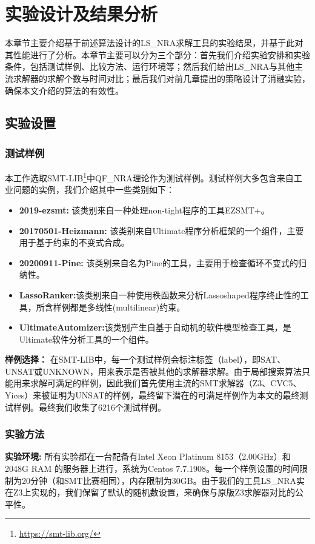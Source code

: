 \chapter{实验设计及结果分析}\label{chap:Result}

本章节主要介绍基于前述算法设计的LS\_NRA求解工具的实验结果，并基于此对其性能进行了分析。本章节主要可以分为三个部分：首先我们介绍实验安排和实验条件，包括测试样例、比较方法、运行环境等；然后我们给出LS\_NRA与其他主流求解器的求解个数与时间对比；最后我们对前几章提出的策略设计了消融实验，确保本文介绍的算法的有效性。

\section{实验设置}
\subsection{测试样例}
本工作选取SMT-LIB\footnote{\url{https://smt-lib.org/}}中QF\_NRA理论作为测试样例。测试样例大多包含来自工业问题的实例，我们介绍其中一些类别如下：

\begin{itemize}
    \item \textbf{2019-ezsmt\cite{SusmanL16, ShenL18}:} 该类别来自一种处理non-tight程序的工具EZSMT+。
    \item \textbf{20170501-Heizmann\cite{Heizmann}:} 该类别来自Ultimate程序分析框架的一个组件，主要用于基于约束的不变式合成。
    \item \textbf{20200911-Pine\cite{Pine}:} 该类别来自名为Pine的工具，主要用于检查循环不变式的归纳性。
    \item \textbf{LassoRanker\cite{LeikeH15, HeizmannHLP13, Lasso3}:}该类别来自一种使用秩函数来分析Lassoshaped程序终止性的工具，所含样例都是多线性(multilinear)约束。
    \item \textbf{UltimateAutomizer:}该类别产生自基于自动机的软件模型检查工具，是Ultimate软件分析工具的一个组件。
\end{itemize}

\textbf{样例选择：} 在SMT-LIB中，每一个测试样例会标注标签（label），即SAT、UNSAT或UNKNOWN，用来表示是否被其他的求解器求解。由于局部搜索算法只能用来求解可满足的样例，因此我们首先使用主流的SMT求解器（Z3、CVC5、Yices）来被证明为UNSAT的样例，最终留下潜在的可满足样例作为本文的最终测试样例。最终我们收集了6216个测试样例。


\subsection{实验方法}
 \textbf{实验环境:} 所有实验都在一台配备有Intel Xeon Platinum 8153（2.00GHz）和2048G RAM 的服务器上进行，系统为Centos 7.7.1908。每一个样例设置的时间限制为20分钟（和SMT比赛相同），内存限制为30GB。由于我们的工具LS\_NRA实在Z3上实现的，我们保留了默认的随机数设置，来确保与原版Z3求解器对比的公平性。

